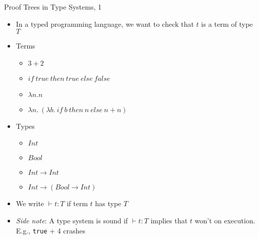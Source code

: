 \begin{frame}{Proof Trees in Type Systems, 1}
\begin{itemize}
	\item In a typed programming language, we want to check that $t$ is a term of type $T$

	\pause

	\item Terms
	\begin{itemize}
		\item $3+2$
		\item $\mathit{if}~\mathit{true}~\mathit{then}~\mathit{true}~\mathit{else}~\mathit{false}$
		\item $λn.n$
		\item $λn.~(λb.~\mathit{if}~b~\mathit{then}~n~\mathit{else}~n+n)$
	\end{itemize}

	\pause

	\item Types
	\begin{itemize}
		\item $\mathit{Int}$
		\item $\mathit{Bool}$
		\item $\mathit{Int}→\mathit{Int}$
		\item $\mathit{Int} → (\mathit{Bool} → \mathit{Int})$
	\end{itemize}

	\pause

	\item We write $⊢ t: T$ if term $t$ has type $T$
\pause

\item \textit{Side note}: A type system is sound if $⊢ t: T$ implies that $t$ won't  on execution. E.g., \lstinline|true| + 4 crashes
\end{itemize}
\end{frame}

